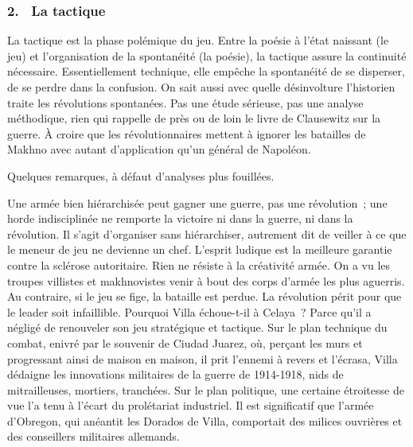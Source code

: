 \documentclass[french,twoside]{book} %
\begin{document}
\subsubsection[{2.  La tactique}]{\textsc{2. } La tactique}
\noindent La tactique est la phase polémique du jeu. Entre la poésie à l’état naissant (le jeu) et l’organisation de la spontanéité (la poésie), la tactique assure la continuité nécessaire. Essentiellement technique, elle empêche la spontanéité de se disperser, de se perdre dans la confusion. On sait aussi avec quelle désinvolture l’historien traite les révolutions spontanées. Pas une étude sérieuse, pas une analyse méthodique, rien qui rappelle de près ou de loin le livre de Clausewitz sur la guerre. À croire que les révolutionnaires mettent à ignorer les batailles de Makhno avec autant d’application qu’un général de Napoléon.\par
Quelques remarques, à défaut d’analyses plus fouillées.\par
Une armée bien hiérarchisée peut gagner une guerre, pas une révolution ; une horde indisciplinée ne remporte la victoire ni dans la guerre, ni dans la révolution. Il s’agit d’organiser sans hiérarchiser, autrement dit de veiller à ce que le meneur de jeu ne devienne un chef. L’esprit ludique est la meilleure garantie contre la sclérose autoritaire. Rien ne résiste à la créativité armée. On a vu les troupes villistes et makhnovistes venir à bout des corps d’armée les plus aguerris. Au contraire, si le jeu se fige, la bataille est perdue. La révolution périt pour que le leader soit infaillible. Pourquoi Villa échoue-t-il à Celaya ? Parce qu’il a négligé de renouveler son jeu stratégique et tactique. Sur le plan technique du combat, enivré par le souvenir de Ciudad Juarez, où, perçant les murs et progressant ainsi de maison en maison, il prit l’ennemi à revers et l’écrasa, Villa dédaigne les innovations militaires de la guerre de 1914-1918, nids de mitrailleuses, mortiers, tranchées. Sur le plan politique, une certaine étroitesse de vue l’a tenu à l’écart du prolétariat industriel. Il est significatif que l’armée d’Obregon, qui anéantit les Dorados de Villa, comportait des milices ouvrières et des conseillers militaires allemands.\par
\end{document}
